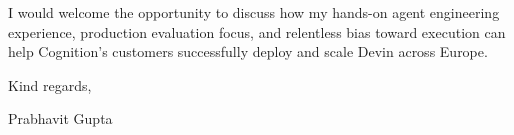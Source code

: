 \documentclass[11pt,a4paper]{article}
\begin{document}
\noindent I would welcome the opportunity to discuss how my hands-on agent engineering experience, production evaluation focus, and relentless bias toward execution can help Cognition's customers successfully deploy and scale Devin across Europe.

\vspace{8pt}

\noindent Kind regards,

\vspace{6pt}

\noindent Prabhavit Gupta
\end{document}
